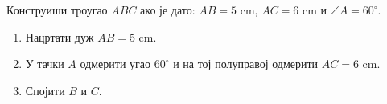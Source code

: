 \documentclass[11pt,a5paper,addpoints]{exam}
\begin{document}
\begin{questions}
\question[3]
Конструиши троугао $ABC$ ако је дато: $AB=5$ cm, $AC=6$ cm и $\angle A=60^\circ$.
\begin{solution}[\stretch{5}]
\begin{enumerate}
\item Нацртати дуж $AB=5$ cm.  
\item У тачки $A$ одмерити угао $60^\circ$ и на тој полуправој одмерити $AC=6$ cm.  
\item Спојити $B$ и $C$.  
\end{enumerate}
\end{solution}

\end{questions}
\end{document}
